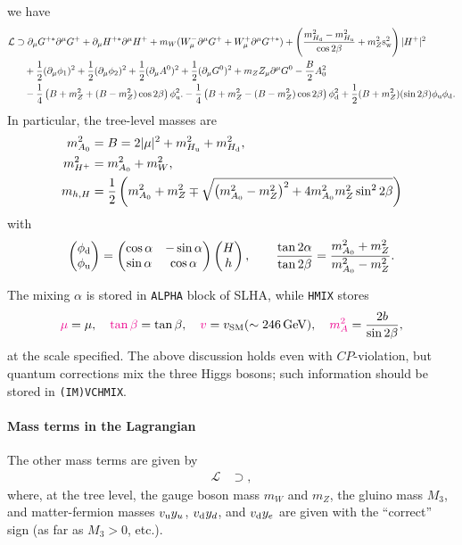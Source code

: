 \documentclass[CheatSheet]{subfiles}
\begin{document}
we have
\begin{equation}
\begin{split}
  \mathcal L &\supset
\partial_\mu G^{+*}\partial^\mu G^+
+\partial_\mu H^{+*}\partial^\mu H^+
+m_W(W^-_\mu\partial^\mu G^+ + W^+_\mu\partial^\mu G^{+*})
+ \left(\frac{m_{H_{\mathrm{d}}}^2-m_{H_{\mathrm{u}}}^2}{\cos2\beta} + m_Z^2\mathrm{s}_{\mathrm w}^2\right)|H^+|^2
\\&\quad
+\frac12(\partial_\mu\phi_1)^2
+\frac12(\partial_\mu\phi_2)^2
+\frac12(\partial_\mu A^0)^2
+\frac12(\partial_\mu G^0)^2
+m_Z Z_\mu\partial^\mu G^0
-\frac{B}{2}A_0^2
\\&\quad
-\frac14\left(B+m_Z^2+(B-m_Z^2)\cos2\beta\right)\phi_{\mathrm{u}}^2.
-\frac14\left(B+m_Z^2-(B-m_Z^2)\cos2\beta\right)\phi_{\mathrm{d}}^2
+\frac12(B+m_Z^2)(\sin 2\beta)\phi_{\mathrm{u}}\phi_{\mathrm{d}}.
\end{split}
\end{equation}
In particular, the tree-level masses are
\begin{align}
 m_{A_0}^2 &= B = 2|\mu|^2+m_{H_{\mathrm{u}}}^2+m_{H_{\mathrm{d}}}^2,
\\
 m_{H^+}^2 &= m_{A_0}^2 + m_W^2,\\
 m_{h,H} &= \frac12\left(m_{A_0}^2 + m_Z^2 \mp \sqrt{\left(m_{A_0}^2-m_Z^2\right)^2+4m_{A_0}^2m_Z^2\sin^22\beta}\right)
\end{align}
with
\begin{equation}
 \begin{pmatrix}\phi_{\mathrm{d}}\\\phi_{\mathrm{u}}\end{pmatrix} = \begin{pmatrix}\cos\alpha&-\sin\alpha\\\sin\alpha & \cos\alpha\end{pmatrix}\begin{pmatrix}H\\h\end{pmatrix},
\qquad
\frac{\tan2\alpha}{\tan2\beta} = \frac{m_{A_0}^2+m_Z^2}{m_{A_0}^2-m_Z^2}.
\end{equation}

The mixing $\alpha$ is stored in \texttt{ALPHA} block of SLHA, while \texttt{HMIX} stores
\begin{equation}
 {\color{magenta}\mu}={\mu},\quad
 {\color{magenta}\tan\beta}=\tan\beta,\quad
 {\color{magenta}v}=v_{\mathrm{SM}}(\sim246\,\mathrm{GeV}),\quad
 {\color{magenta}m_A^2}=\frac{2b}{\sin2\beta},
\end{equation}
at the scale specified.
The above discussion holds even with $CP$-violation, but quantum corrections mix the three Higgs bosons; such information should be stored in \texttt{(IM)VCHMIX}.


\paragraph{Mass terms in the Lagrangian}
The other mass terms are given by
\begin{equation}
 \begin{split}
\mathcal L&\supset
   ,
 \end{split}
\end{equation}
where, at the tree level, the gauge boson mass $m_W$ and $m_Z$, the gluino mass $M_3$, and matter-fermion masses $v_{\mathrm{u}}y_{u}$, $v_{\mathrm{d}}y_{d}$, and $v_{\mathrm{d}}y_{e}$ are given with the ``correct'' sign (as far as $M_3>0$, etc.).
\end{document}
